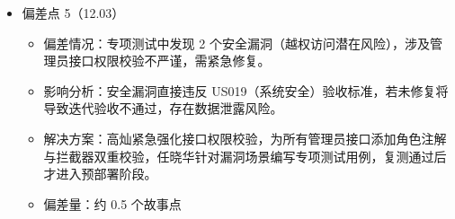 \begin{levellist}
\begin{enumerate}
\begin{itemize}
                  \item 偏差点 5（12.03）
                        \begin{itemize}
                            \item 偏差情况：专项测试中发现 2 个安全漏洞（越权访问潜在风险），涉及管理员接口权限校验不严谨，需紧急修复。
                            \item 影响分析：安全漏洞直接违反 US019（系统安全）验收标准，若未修复将导致迭代验收不通过，存在数据泄露风险。
                            \item 解决方案：高灿紧急强化接口权限校验，为所有管理员接口添加角色注解与拦截器双重校验，任晓华针对漏洞场景编写专项测试用例，复测通过后才进入预部署阶段。
                            \item 偏差量：约 0.5 个故事点
                        \end{itemize}

              \end{itemize}

    \end{enumerate}

\end{levellist}
